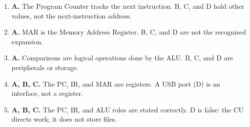 \documentclass[11pt]{article}
\begin{document}
\begin{enumerate}[label=\textbf{Q\arabic*.}, leftmargin=*]
\item \textbf{A.} The Program Counter tracks the next instruction. B, C, and D hold other values, not the next-instruction address.
\item \textbf{A.} MAR is the Memory Address Register. B, C, and D are not the recognised expansion.
\item \textbf{A.} Comparisons are logical operations done by the ALU. B, C, and D are peripherals or storage.
\item \textbf{A, B, C.} The PC, IR, and MAR are registers. A USB port (D) is an interface, not a register.
\item \textbf{A, B, C.} The PC, IR, and ALU roles are stated correctly. D is false: the CU directs work; it does not store files.
\end{enumerate}
\def\JKSSBLessonID{5}\def\JKSSBAnswers{1}
\end{document}
